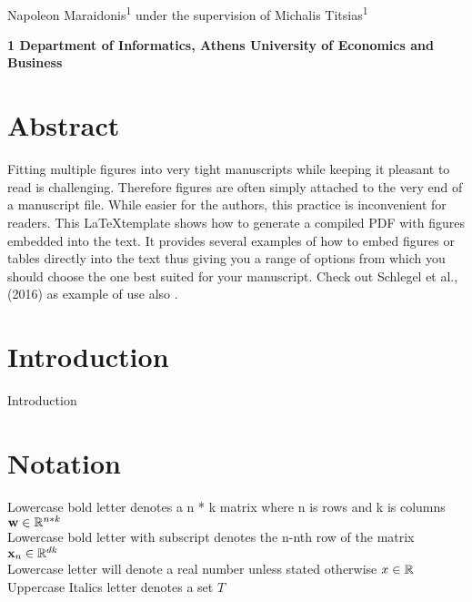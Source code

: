 \documentclass[10pt,letterpaper]{article}
\begin{document}
\vspace*{0.35in}
	\begin{flushleft}
		{\Large
			\textbf{}
		}
		\newline
		\\
		Napoleon Maraidonis\textsuperscript{1} under the supervision of
		Michalis Titsias\textsuperscript{1}		
						
		\bigskip
		\bf{1} Department of Informatics, Athens University of Economics and Business
		\\		
	\end{flushleft}
	
	\section*{Abstract}
	Fitting multiple figures into very tight manuscripts while keeping it pleasant to read is challenging. Therefore figures are often simply attached to the very end of a manuscript file. While easier for the authors, this practice is inconvenient for readers. This \LaTeX template shows how to generate a compiled PDF with figures embedded into the text. It provides several examples of how to embed figures or tables directly into the text thus giving you a range of options from which you should choose the one best suited for your manuscript. Check out Schlegel et al., (2016) as example of use \cite{MLC_madrid} also \cite{extreme_MLC}.
	
	\section*{Introduction}
	
	Introduction \cite{extreme_MLC_omar} \cite{extreme_MLC_rep} \cite{MLC_finland}
	

	\section*{Notation}
		Lowercase bold letter denotes a n * k matrix where n is rows and k is columns   $\textbf{w} \in  {\Bbb R}^{n * k}$\\
		Lowercase bold letter with subscript denotes the n-nth row of the matrix  
		$\textbf{x}_{n} \in  {\Bbb R}^{dk}$\\
		Lowercase letter will denote a real number unless stated otherwise
		$x \in {\Bbb R}$\\
		Uppercase Italics letter denotes a set
		$\textit{T} $
\end{document}
